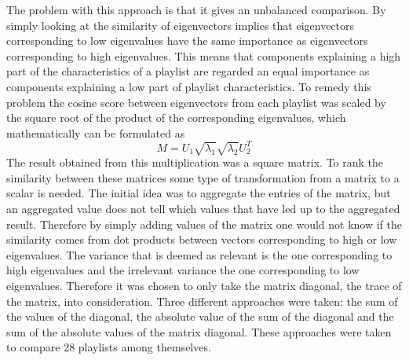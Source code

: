 \documentclass[a4paper,11pt]{kth-mag}
\begin{document}
The problem with this approach is that it gives an unbalanced comparison. By simply looking at the similarity of eigenvectors implies that eigenvectors corresponding to low eigenvalues have the same importance as eigenvectors corresponding to high eigenvalues. This means that components explaining a high part of the characteristics of a playlist are regarded an equal importance as components explaining a low part of playlist characteristics. To remedy this problem the cosine score between eigenvectors from each playlist was scaled by the square root of the product of the corresponding eigenvalues, which mathematically can be formulated as  \[M = U_1 \sqrt{\lambda_1} \sqrt{\lambda_2} U_2^T \] The result obtained from this multiplication was a square matrix. To rank the similarity between these matrices some type of transformation from a matrix to a scalar is needed. The initial idea was to aggregate the entries of the matrix, but an aggregated value does not tell which values that have led up to the aggregated result. Therefore by simply adding values of the matrix one would not know if the similarity comes from dot products between vectors corresponding to high or low eigenvalues. The variance that is deemed as relevant is the one corresponding to high eigenvalues and the irrelevant variance the one corresponding to low eigenvalues. Therefore it was chosen to only take the matrix diagonal, the trace of the matrix, into consideration. Three different approaches were taken: the sum of the values of the diagonal, the absolute value of the sum of the diagonal and the sum of the absolute values of the matrix diagonal. These approaches were taken to compare 28 playlists among themselves.
\end{document}

